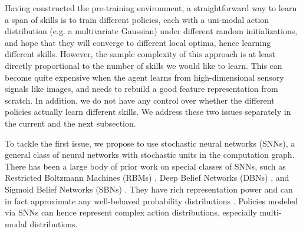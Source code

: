 \documentclass{article} %
\begin{document}
Having constructed the pre-training environment, a straightforward way to learn a span of skills is to train different policies, each with a uni-modal action distribution (e.g. a multivariate Gaussian) under different random initializations, and hope that they will converge to different local optima, hence learning different skills. However, the sample complexity of this approach is at least directly proportional to the number of skills we would like to learn. This can become quite expensive when the agent learns from high-dimensional sensory signals like images, and needs to rebuild a good feature representation from scratch. In addition, we do not have any control over whether the different policies actually learn different skills. We address these two issues separately in the current and the next subsection.

To tackle the first issue, we propose to use stochastic neural networks (SNNs), a general class of neural networks with stochastic units in the computation graph. There has been a large body of prior work on special classes of SNNs, such as Restricted Boltzmann Machines (RBMs) \citep{smolensky1986information, hinton2002training}, Deep Belief Networks (DBNs) \citep{hinton2006fast}, and Sigmoid Belief Networks (SBNs) \citep{neal1990learning, Tang2014_FSNN}. They have rich representation power and can in fact approximate any well-behaved probability distributions \citep{le2008representational, cho2013gaussian}. Policies modeled via SNNs can hence represent complex action distributions, especially multi-modal distributions.
\end{document}
